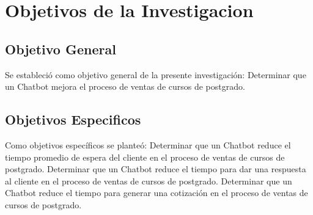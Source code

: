 \documentclass[10pt,a4paper]{article}
\begin{document}
	
	\section{Objetivos de la Investigacion}
		    
	\subsection{Objetivo General}

	Se estableció como objetivo general de la presente investigación: Determinar que un Chatbot mejora el proceso de ventas de cursos de postgrado.

 

    \subsection{Objetivos Especificos}
	Como objetivos específicos se planteó: Determinar que un Chatbot reduce el tiempo promedio de espera del cliente en el proceso de ventas de cursos de postgrado. Determinar que un Chatbot reduce el tiempo para dar una respuesta al cliente en el proceso de ventas de cursos de postgrado. Determinar que un Chatbot reduce el tiempo para generar una cotización en el proceso de ventas de cursos de postgrado.


 		    
	
\end{document}
